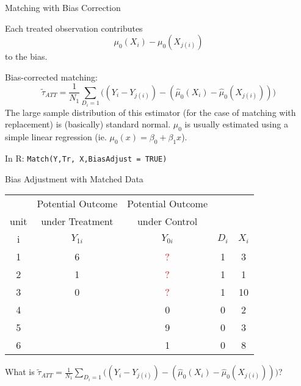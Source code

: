 \documentclass{beamer}
\numberwithin{equation}{section}
\begin{document}
\begin{frame}{Matching with Bias Correction}

Each treated observation contributes \[
\mu_0(X_i)-\mu_0(X_{j(i)})
\] to the bias.

Bias-corrected matching: \[
\tilde\tau_{ATT}= \frac{1}{N_1}\sum_{D_i=1} \Big((Y_i-Y_{j(i)})-
(\widehat\mu_0(X_i)-\widehat\mu_0(X_{j(i)}))
\Big)
\] The large sample distribution of this estimator (for the case of
matching with replacement) is (basically) standard normal. $\mu_0$ is
usually estimated using a simple linear regression (ie.
$\mu_0(x)=\beta_0 + \beta_1 x$).\\\bigskip

In R: \texttt{Match(Y,Tr, X,BiasAdjust = TRUE)}

\end{frame}

\begin{frame}{Bias Adjustment with Matched Data}

\begin{tabular}{c|c|c|c|c}
 &Potential Outcome & Potential Outcome &   & \\
unit &under Treatment  & under Control &   &  \\

\hline
   i  & $Y_{1i}$  & $Y_{0i}$ &    $D_i$ &  $X_i$ \\
\hline
         1 & \multicolumn{ 1}{c|}{6} & \multicolumn{ 1}{c|}{\textcolor{red}{?}} &                    1 &          3 \\
         2 & \multicolumn{ 1}{c|}{1} & \multicolumn{ 1}{c|}{\textcolor{red}{?}} &                    1 &          1 \\
         3 & \multicolumn{ 1}{c|}{0} & \multicolumn{ 1}{c|}{\textcolor{red}{?}} &                    1 &          10 \\
\hline
         4 & \multicolumn{ 1}{c|}{} & \multicolumn{1}{c|}{0} &                    0 &          2 \\
         5 & \multicolumn{ 1}{c|}{} & \multicolumn{1}{c|}{9} &                    0 &          3 \\
         6 & \multicolumn{ 1}{c|}{} & \multicolumn{1}{c|}{1} &                    0 &          8 \\
         \hline
\end{tabular}

What is
$\tilde\tau_{ATT}= \frac{1}{N_1}\sum_{D_i=1} \Big((Y_i-Y_{j(i)})- (\widehat\mu_0(X_i)-\widehat\mu_0(X_{j(i)})) \Big)$?

\end{frame}
\end{document}

